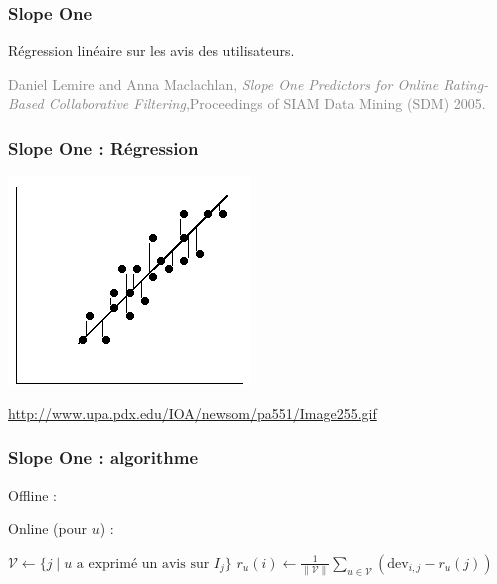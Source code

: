 \documentclass[t]{beamer}
\newcommand\gray[1]{\textcolor{gray}{#1}}
\begin{document}

\begin{frame}
  \frametitle{Slope One}

  \vspace{1cm}
  Régression linéaire sur les avis des utilisateurs.
  \vspace{1cm}
  
  \gray{Daniel Lemire and Anna Maclachlan, \textit{Slope One
      Predictors for Online Rating-Based Collaborative
      Filtering},Proceedings of SIAM Data Mining (SDM) 2005.}
\end{frame}

\begin{frame}
  \frametitle{Slope One : Régression}

  \vspace{1cm}
  \centerline{\includegraphics[height=.4\textheight]{regression.png}}

  \vspace{1cm}
  \centerline{\gray{\footnotesize \url{http://www.upa.pdx.edu/IOA/newsom/pa551/Image255.gif}}}
  
\end{frame}

\begin{frame}
  \frametitle{Slope One : algorithme}

  Offline :
  \DontPrintSemicolon
  \begin{algorithm}[H]
  \end{algorithm}
  \bigskip
    Online (pour $u$) :
  \DontPrintSemicolon
  \begin{algorithm}[H]
    $\mathcal{V} \gets \{ j \mid u \mbox{ a exprimé un avis
      sur } I_j \} $\;
    $r_u(i) \gets \frac{1}{\parallel\mathcal{V}\parallel}
    \sum_{u\in\mathcal{V}} (\mbox{dev}_{i,j} - r_u(j))$ \;
  \end{algorithm}


\end{frame}
\end{document}
